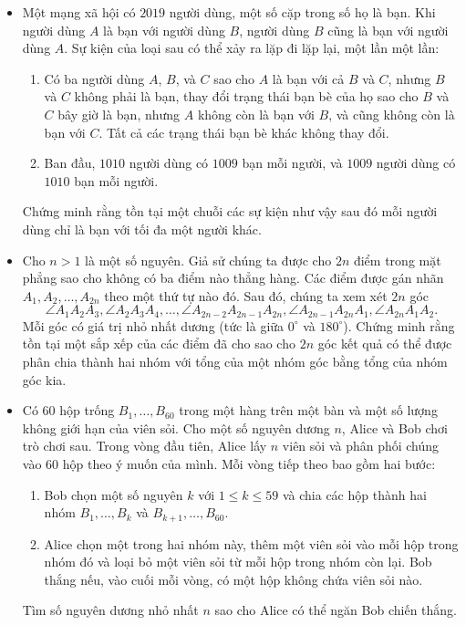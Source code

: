 \documentclass[11pt]{scrartcl}
\begin{document}
\begin{itemize}[label=, leftmargin=0em, itemsep=-0em]
    \item \begin{btvn}
        Một mạng xã hội có $2019$ người dùng, một số cặp trong số họ là bạn. Khi người dùng $A$ là bạn với người dùng $B$, người dùng $B$ cũng là bạn với người dùng $A$. Sự kiện của loại sau có thể xảy ra lặp đi lặp lại, một lần một lần:
        \begin{enumerate}
            \item Có ba người dùng $A$, $B$, và $C$ sao cho $A$ là bạn với cả $B$ và $C$, nhưng $B$ và $C$ không phải là bạn, thay đổi trạng thái bạn bè của họ sao cho $B$ và $C$ bây giờ là bạn, nhưng $A$ không còn là bạn với $B$, và cũng không còn là bạn với $C$. Tất cả các trạng thái bạn bè khác không thay đổi.
            \item Ban đầu, $1010$ người dùng có $1009$ bạn mỗi người, và $1009$ người dùng có $1010$ bạn mỗi người.
        \end{enumerate}
        Chứng minh rằng tồn tại một chuỗi các sự kiện như vậy sau đó mỗi người dùng chỉ là bạn với tối đa một người khác.
    \end{btvn}

    \item \begin{btvn}
        Cho $n>1$ là một số nguyên. Giả sử chúng ta được cho $2n$ điểm trong mặt phẳng sao cho không có ba điểm nào thẳng hàng. Các điểm được gán nhãn $A_1, A_2, \dots , A_{2n}$ theo một thứ tự nào đó. Sau đó, chúng ta xem xét $2n$ góc 
        \[\angle A_1A_2A_3, \angle A_2A_3A_4, \dots , \angle A_{2n-2}A_{2n-1}A_{2n}, \angle A_{2n-1}A_{2n}A_1, \angle A_{2n}A_1A_2.\] 
        Mỗi góc có giá trị nhỏ nhất dương (tức là giữa $0^{\circ}$ và $180^{\circ}$). Chứng minh rằng tồn tại một sắp xếp của các điểm đã cho sao cho $2n$ góc kết quả có thể được phân chia thành hai nhóm với tổng của một nhóm góc bằng tổng của nhóm góc kia.
    \end{btvn}

    \item \begin{btvn}
        Có 60 hộp trống $B_1,\ldots,B_{60}$ trong một hàng trên một bàn và một số lượng không giới hạn của viên sỏi. Cho một số nguyên dương $n$, Alice và Bob chơi trò chơi sau.
        Trong vòng đầu tiên, Alice lấy $n$ viên sỏi và phân phối chúng vào 60 hộp theo ý muốn của mình. Mỗi vòng tiếp theo bao gồm hai bước:
        \begin{enumerate}
            \item Bob chọn một số nguyên $k$ với $1\leq k\leq 59$ và chia các hộp thành hai nhóm $B_1,\ldots,B_k$ và $B_{k+1},\ldots,B_{60}$.
            \item Alice chọn một trong hai nhóm này, thêm một viên sỏi vào mỗi hộp trong nhóm đó và loại bỏ một viên sỏi từ mỗi hộp trong nhóm còn lại.
            Bob thắng nếu, vào cuối mỗi vòng, có một hộp không chứa viên sỏi nào. 
        \end{enumerate}
        Tìm số nguyên dương nhỏ nhất $n$ sao cho Alice có thể ngăn Bob chiến thắng.
    \end{btvn}


\end{itemize}
\end{document}
